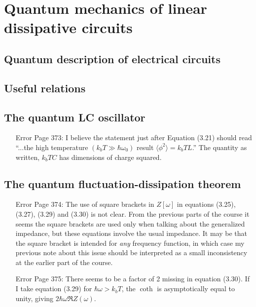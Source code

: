 \section{Quantum mechanics of linear dissipative circuits}

\subsection{Quantum description of electrical circuits}

\subsection{Useful relations}

\subsection{The quantum LC oscillator}

\begin{itemize}

\item[Error] Page 373: I believe the statement just after Equation (3.21) should read ``...the high temperature $(k_bT \gg \hbar \omega_0)$ result $\langle \phi^2 \rangle=k_b T L$.''
The quantity as written, $k_b T C$ has dimensions of charge squared.

\end{itemize}

\subsection{The quantum fluctuation-dissipation theorem}

\begin{itemize}

\item[Error] Page 374: The use of square brackets in $Z[\omega]$ in equations (3.25), (3.27), (3.29) and (3.30) is not clear. From the previous parts of the course it seems the square brackets are used only when talking about the generalized impedance, but these equations involve the usual impedance. It may be that the square bracket is intended for \emph{any} frequency function, in which case my previous note about this issue should be interpreted as a small inconsistency at the earlier part of the course.

\item[Error] Page 375: There seems to be a factor of 2 missing in equation (3.30). If I take equation (3.29) for $\hbar \omega > k_b T$, the $\coth$ is asymptotically equal to unity, giving $2 \hbar \omega \Re Z(\omega)$.

\end{itemize}

